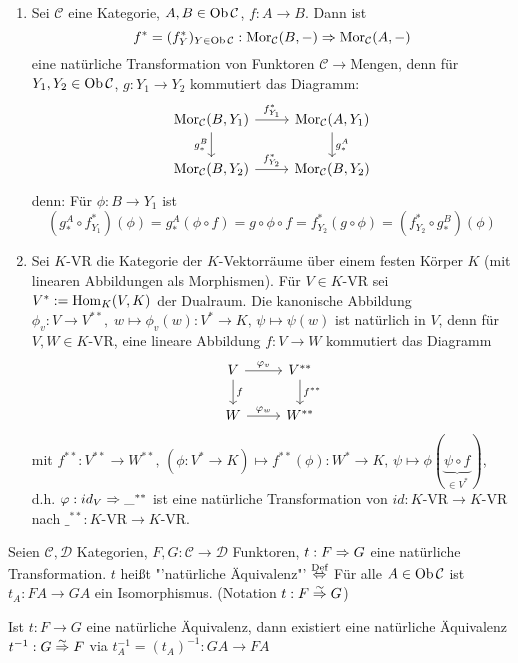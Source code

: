 \begin{bsp}
	\begin{enumerate}[label= \alph*)]
		\item Sei $\mathcal{C}$ eine Kategorie, $A,B\in \text{Ob}\,\mathcal{C}$, $f:A\to B$. Dann ist 
		$$f^* = (f^*_Y)_{Y\in \text{Ob}\,\mathcal{C}} : \text{Mor}_{\mathcal{C}}(B, -) \Rightarrow \text{Mor}_{\mathcal{C}}(A, -)$$
		eine natürliche Transformation von Funktoren $\mathcal{C} \to \text{Mengen}$, denn für $Y_1, Y_2\in \text{Ob}\,\mathcal{C}$, $g:Y_1 \to Y_2$ kommutiert das Diagramm:
		$$\begin{tikzcd}
		\Mor_{\mathcal{C}}(B, Y_1) \arrow{r}{f_{Y_1}^*}\arrow[swap]{d}{g_*^B} & \Mor_{\mathcal{C}}(A, Y_1)\arrow{d}{g_*^A} \\
		\Mor_{\mathcal{C}}(B, Y_2) \arrow{r}{f_{Y_2}^*} & \Mor_{\mathcal{C}}(B, Y_2)
		\end{tikzcd}$$
		denn: Für $\phi:B\to Y_1$ ist 
		$$(g_*^A \circ f_{Y_1}^*)(\phi) = g_*^A(\phi \circ f) = g \circ \phi \circ f = f^*_{Y_2}(g\circ \phi) = (f_{Y_2}^* \circ g_*^B) (\phi)$$
		\item Sei $K$-VR die Kategorie der $K$-Vektorräume über einem festen Körper $K$ (mit linearen Abbildungen als Morphismen). Für $V\in K$-VR sei $V^*:= \operatorname{Hom}_K(V,K)$ der Dualraum. Die kanonische Abbildung $\phi_v:V \to V^{**}, \; w \mapsto \phi_v(w):V^* \to K, \, \psi \mapsto \psi(w)$ ist natürlich in $V$, denn für $V,W \in K$-VR, eine lineare Abbildung $f:V \to W$ kommutiert das Diagramm
		$$\begin{tikzcd}
		V \arrow{r}{\phi_v}\arrow{d}{f} & V^{**}  \arrow{d}{f^{**}} \\W \arrow{r}{\phi_w} & W^{**}
		\end{tikzcd}$$
		mit $f^{**}: V^{**} \to W^{**}, \, (\phi: V^* \to K) \mapsto f^{**}(\phi) : W^* \to K, \, \psi \mapsto \phi(\underbrace{\psi \circ f}_{\in V^*})$, d.h. $\varphi:id_V \Rightarrow \_^{**}$ ist eine natürliche Transformation von $id:K$-VR$ \to K$-VR nach $\_^{**}:K$-VR$ \to K$-VR.
	\end{enumerate}
\end{bsp}
\begin{df}
	Seien $\mathcal{C}, \mathcal{D}$ Kategorien, $F,G: \mathcal{C} \to \mathcal{D}$ Funktoren, $t:F\Rightarrow G$ eine natürliche Transformation. $t$ heißt "'natürliche Äquivalenz"' $\overset{\text{Def}}{\Leftrightarrow}$ Für alle $A\in \text{Ob}\,\mathcal{C}$ ist $t_A:FA \to GA$ ein Isomorphismus. (Notation $t: F\overset{\sim}{\Rightarrow} G$)
\end{df}
\begin{anm}
	Ist $t:F\to G$ eine natürliche Äquivalenz, dann existiert eine natürliche Äquivalenz $t^{-1}: G \overset{\sim}{\Rightarrow} F$ via $t_A^{-1} = (t_A)^{-1} : GA \to FA$ 
\end{anm}
